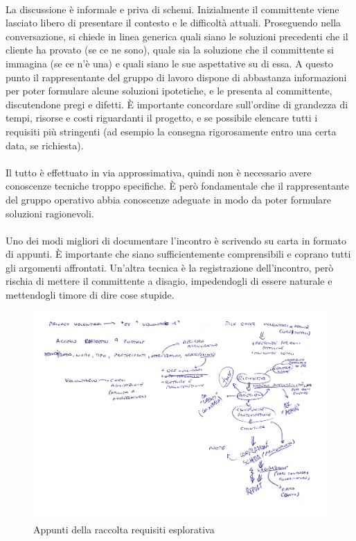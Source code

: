 \documentclass[11pt,a4paper,english]{article}
\begin{document}
\paragraph{} La discussione è informale e priva di schemi. Inizialmente il committente viene lasciato libero di presentare il contesto e le difficoltà attuali. Proseguendo nella conversazione, si chiede in linea generica quali siano le soluzioni precedenti che il cliente ha provato (se ce ne sono), quale sia la soluzione che il committente si immagina (se ce n'è una) e quali siano le sue aspettative su di essa. A questo punto il rappresentante del gruppo di lavoro dispone di abbastanza informazioni per poter formulare alcune soluzioni ipotetiche, e le presenta al committente, discutendone pregi e difetti. È importante concordare sull'ordine di grandezza di tempi, risorse e costi riguardanti il progetto, e se possibile elencare tutti i requisiti più stringenti (ad esempio la consegna rigorosamente entro una certa data, se richiesta). 

\paragraph{} Il tutto è effettuato in via approssimativa, quindi non è necessario avere conoscenze tecniche troppo specifiche. È però fondamentale che il rappresentante del gruppo operativo abbia conoscenze adeguate in modo da poter formulare soluzioni ragionevoli.

\paragraph{} Uno dei modi migliori di documentare l'incontro è scrivendo su carta in formato di appunti. È importante che siano sufficientemente comprensibili e coprano tutti gli argomenti affrontati. Un'altra tecnica è la registrazione dell'incontro, però rischia di mettere il committente a disagio, impedendogli di essere naturale e mettendogli timore di dire cose stupide. 


\begin{figure}[H]
    \centering
    \includegraphics[width=1.0\textwidth]{img/analisi_esplorativa.pdf}
    \caption{Appunti della raccolta requisiti esplorativa}
\end{figure}
\end{document}
